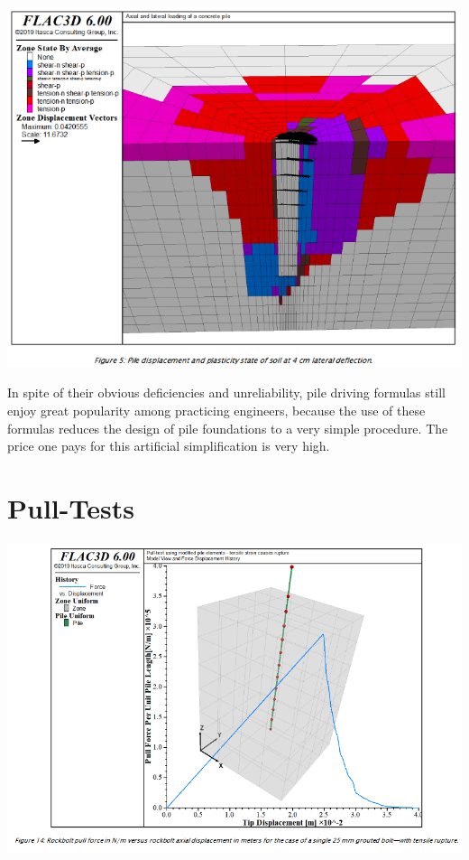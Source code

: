 \documentclass[a4paper, nobind]{templates/ociamthesis}
\begin{document}
\includegraphics[width=1\linewidth]{myfigureeeeee/i}

\newpage

\begin{savequote}
In spite of their obvious deficiencies and unreliability, pile driving
formulas still enjoy great popularity among practicing engineers,
because the use of these formulas reduces the design of pile foundations
to a very simple procedure. The price one pays for this artificial
simplification is very high.
\end{savequote}

\hypertarget{pull-tests}{%
\chapter{Pull-Tests}\label{pull-tests}}

\includegraphics[width=1\linewidth]{myfigureeeeee/j}
\end{document}
